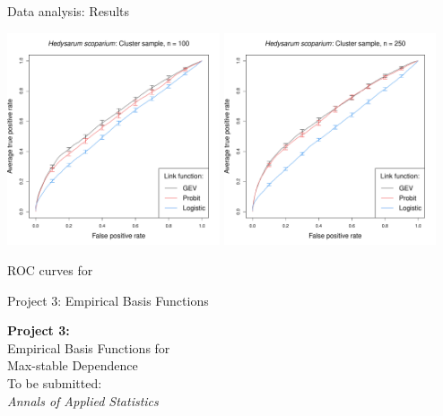 \documentclass{beamer}
\begin{document}
\begin{frame}{Data analysis: Results}
	\begin{center}
		\includegraphics[width=0.47\textwidth]{data-perf-species2-100-clu}
		\includegraphics[width=0.47\textwidth]{data-perf-species2-250-clu}

		ROC curves for \hedysarum{}
	\end{center}
\end{frame}

\begin{frame}{Project 3: Empirical Basis Functions}
	\begin{center}
		\LARGE
		\textbf{Project 3:}\\ [1em]
		Empirical Basis Functions for \\
		Max-stable Dependence\\ [2em]
		\normalsize
		To be submitted:\\
		\emph{Annals of Applied Statistics}
	\end{center}
\end{frame}
\end{document}
